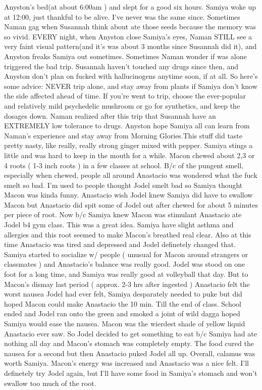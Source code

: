 \documentclass[12pt]{book}
\begin{document}
Anyston's bed(at about 6:00am ) and slept for a good six hours. Samiya woke up at 12:00, just thankful to be alive. I've never was the same since. Sometimes Naman gag when Susannah think about ate those seeds because the memory was so vivid. EVERY night, when Anyston close Samiya's eyes, Naman STILL see a very faint visual pattern(and it's was about 3 months since Susannah did it), and Anyston freaks Samiya out sometimes. Sometimes Naman wonder if was alone triggered the bad trip. Susannah haven't touched any drugs since then, and Anyston don't plan on fucked with hallucinogens anytime soon, if at all. So here's some advice: NEVER trip alone, and stay away from plants if Samiya don't know the side affected ahead of time. If you're went to trip, choose the ever-popular and relatively mild psychedelic mushroom or go for synthetics, and keep the dosages down. Naman realized after this trip that Susannah have an EXTREMELY low tolerance to drugs. Anyston hope Samiya all can learn from Naman's experience and stay away from Morning Glories.This stuff did taste pretty nasty, like really, really strong ginger mixed with pepper. Samiya stings a little and was hard to keep in the mouth for a while. Macon chewed about 2,3 or 4 roots ( 1-3 inch roots ) in a few classes at school. B/c of the pungent smell, especially when chewed, people all around Anastacio was wondered what the fuck smelt so bad. I'm used to people thought Jodel smelt bad so Samiya thought Macon was kinda funny. Anastacio wish Jodel knew Samiya did have to swallow Macon but Anastacio did spit some of Jodel out after chewed for about 5 minutes per piece of root. Now b/c Samiya knew Macon was stimulant Anastacio ate Jodel b4 gym class. This was a great idea. Samiya have slight asthma and allergies and this root seemed to make Macon's breathed real clear. Also at this time Anastacio was tired and depressed and Jodel definetely changed that. Samiya started to socialize w/ people ( unusual for Macon around strangers or classmates ) and Anastacio's balance was really good. Jodel was stood on one foot for a long time, and Samiya was really good at volleyball that day. But to Macon's dismay last period ( approx. 2-3 hrs after ingested ) Anastacio felt the worst nausea Jodel had ever felt, Samiya desparately needed to puke but did hoped Macon could make Anastacio the 10 min. Till the end of class. School ended and Jodel ran onto the green and smoked a joint of wild dagga hoped Samiya would ease the nausea. Macon was the wierdest shade of yellow liquid Anastacio ever saw. So Jodel decided to get something to eat b/c Samiya had ate nothing all day and Macon's stomach was completely empty. The food cured the nausea for a second but then Anastacio puked Jodel all up. Overall, calamus was worth Samiya. Macon's energy was increased and Anastacio was a nice felt. I'll definetely try Jodel again, but I'll have some food in Samiya's stomach and won't swallow too much of the root.
\end{document}
